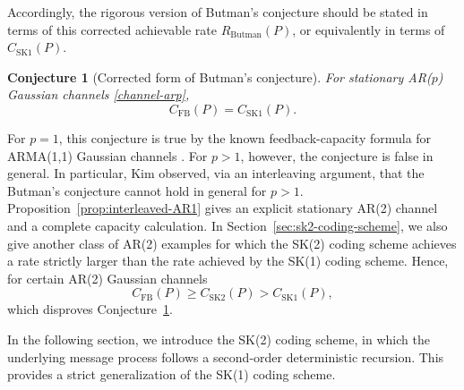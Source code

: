 \documentclass[12pt]{article}
\newtheorem{conj}[thm]{Conjecture}
\begin{document}
Accordingly, the rigorous version of Butman's conjecture should be stated in terms of this corrected achievable rate $R_{\mathrm{Butman}}(P)$, or equivalently in terms of $C_{\mathrm{SK1}}(P)$.
\begin{conj}[Corrected form of Butman's conjecture]\label{Butman-conj:label}
For stationary AR($p$) Gaussian channels \eqref{channel-arp},
\[
    C_{\mathrm{FB}}(P)=C_{\mathrm{SK1}}(P).
\]
\end{conj}
For \(p=1\), this conjecture is true by the known feedback-capacity formula for ARMA(1,1) Gaussian channels \cite{kim2009feedback,yang2007feedback,sabag2023}. For \(p>1\), however, the conjecture is false in general. In particular, Kim \cite[Section IV]{Kim2006} observed, via an interleaving argument, that the Butman's conjecture cannot hold in general for $p>1$. Proposition~\ref{prop:interleaved-AR1} gives an explicit stationary AR(2) channel and a complete capacity calculation. In Section~\ref{sec:sk2-coding-scheme}, we also give another class of AR(2) examples for which the SK(2) coding scheme achieves a rate strictly larger than the rate achieved by the SK(1) coding scheme. Hence, for certain AR(2) Gaussian channels
\[
    C_{\mathrm{FB}}(P) \ge C_{\mathrm{SK2}}(P) > C_{\mathrm{SK1}}(P),
\]
which disproves Conjecture~\ref{Butman-conj:label}.

In the following section, we introduce the SK(2) coding scheme, in which the underlying message process follows a second-order deterministic recursion. This provides a strict generalization of the SK(1) coding scheme.
\end{document}
